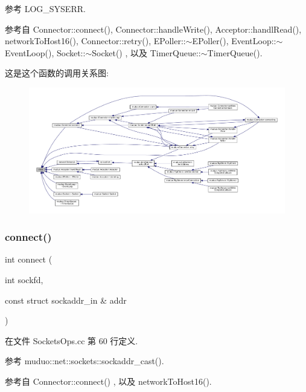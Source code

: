 参考 L\+O\+G\+\_\+\+S\+Y\+S\+E\+RR.



参考自 Connector\+::connect(), Connector\+::handle\+Write(), Acceptor\+::handl\+Read(), network\+To\+Host16(), Connector\+::retry(), E\+Poller\+::$\sim$\+E\+Poller(), Event\+Loop\+::$\sim$\+Event\+Loop(), Socket\+::$\sim$\+Socket() , 以及 Timer\+Queue\+::$\sim$\+Timer\+Queue().

这是这个函数的调用关系图\+:
\nopagebreak
\begin{figure}[H]
\begin{center}
\leavevmode
\includegraphics[width=350pt]{namespacemuduo_1_1sockets_acb275b6d8b5979229bae664cb7ee14da_icgraph}
\end{center}
\end{figure}
\mbox{\label{namespacemuduo_1_1sockets_a349a8d2188d9632596b2e5213cb16436}} 
\subsubsection{\texorpdfstring{connect()}{connect()}}
{\footnotesize\ttfamily int connect (\begin{DoxyParamCaption}\item[{int}]{sockfd,  }\item[{const struct sockaddr\+\_\+in \&}]{addr }\end{DoxyParamCaption})}



在文件 Sockets\+Ops.\+cc 第 60 行定义.



参考 muduo\+::net\+::sockets\+::sockaddr\+\_\+cast().



参考自 Connector\+::connect() , 以及 network\+To\+Host16().

